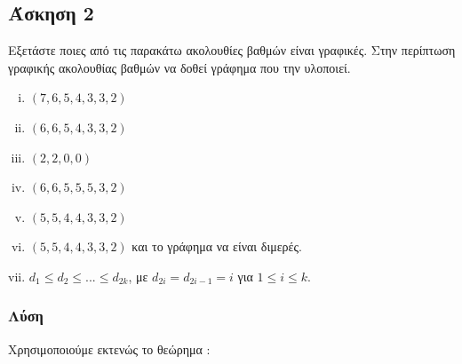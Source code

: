 \newpage\subsection*{Άσκηση 2}

Εξετάστε ποιες από τις παρακάτω ακολουθίες βαθμών είναι γραφικές. Στην 
περίπτωση γραφικής ακολουθίας βαθμών να δοθεί γράφημα που την υλοποιεί.

\begin{enumerate}[i.]

\item $(7,6,5,4,3,3,2)$
\item $(6,6,5,4,3,3,2)$
\item $(2,2,0,0)      $
\item $(6,6,5,5,5,3,2)$
\item $(5,5,4,4,3,3,2)$
\item $(5,5,4,4,3,3,2)$ και το γράφημα να είναι διμερές.
\item $d_1 \le d_2 \le ... \le d_{2k}$, με $d_{2i} = d_{2i-1} = i$ για $1 \le i \le k$.

\end{enumerate}

\subsubsection*{Λύση}

Χρησιμοποιούμε εκτενώς το θεώρημα :

